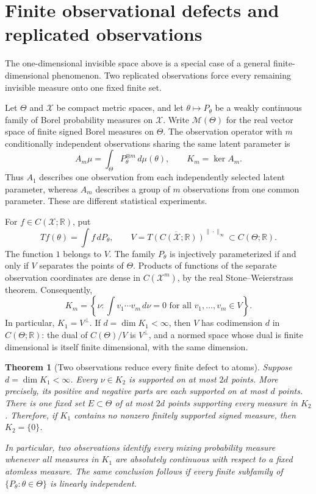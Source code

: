 \documentclass[11pt,letterpaper]{article}
\newtheorem{theorem}{Theorem}[section]
\theoremstyle{definition}
\theoremstyle{remark}
\newcommand{\1}{\mathbf 1}
\begin{document}
\section{Finite observational defects and replicated observations}

The one-dimensional invisible space above is a special case of a general
finite-dimensional phenomenon. Two replicated observations force every
remaining invisible measure onto one fixed finite set.
\label{p10:sec:finite-defect}

Let $\Theta$ and $\mathcal X$ be compact metric spaces, and let
$\theta\mapsto P_\theta$ be a weakly continuous family of Borel probability
measures on $\mathcal X$.  Write $\mathcal M(\Theta)$ for the real vector space
of finite signed Borel measures on $\Theta$.  The observation operator with
$m$ conditionally independent observations sharing the same latent parameter is
\[
 A_m\mu=\int_\Theta P_\theta^{\otimes m}\,d\mu(\theta),
 \qquad K_m=\ker A_m.
\]
Thus $A_1$ describes one observation from each independently selected latent
parameter, whereas $A_m$ describes a group of $m$ observations from one common
parameter.  These are different statistical experiments.

For $f\in C(\mathcal X;\mathbb R)$, put
\[
 Tf(\theta)=\int f\,dP_\theta,
 \qquad
 V=\overline{T(C(\mathcal X;\mathbb R))}^{\|\cdot\|_\infty}
       \subset C(\Theta;\mathbb R).
\]
The function $1$ belongs to $V$.  The family $P_\theta$ is injectively
parameterized if and only if $V$ separates the points of $\Theta$.
Products of functions of the separate observation coordinates are dense in
$C(\mathcal X^m)$, by the real Stone--Weierstrass theorem.  Consequently,
\begin{equation}\label{p10:eq:finite-defect-annihilator}
 K_m=\left\{\nu:\int v_1\cdots v_m\,d\nu=0
                    \text{ for all }v_1,\ldots,v_m\in V\right\}.
\end{equation}
In particular, $K_1=V^\perp$.  If $d=\dim K_1<\infty$, then $V$ has
codimension $d$ in $C(\Theta;\mathbb R)$: the dual of $C(\Theta)/V$ is
$V^\perp$, and a normed space whose dual is finite dimensional is itself
finite dimensional, with the same dimension.

\begin{theorem}[Two observations reduce every finite defect to atoms]
\label{p10:thm:finite-defect-atoms}
Suppose $d=\dim K_1<\infty$.  Every $\nu\in K_2$ is supported on at most
$2d$ points.  More precisely, its positive and negative parts are each
supported on at most $d$ points.  There is one fixed set $E\subset\Theta$
of at most $2d$ points supporting every measure in $K_2$.  Therefore, if $K_1$ contains no nonzero
finitely supported signed measure, then $K_2=\{0\}$.

In particular, two observations identify every mixing probability measure
whenever all measures in $K_1$ are absolutely continuous with respect to a
fixed atomless measure.  The same conclusion follows if every finite
subfamily of $\{P_\theta:\theta\in\Theta\}$ is linearly independent.
\end{theorem}
\end{document}
